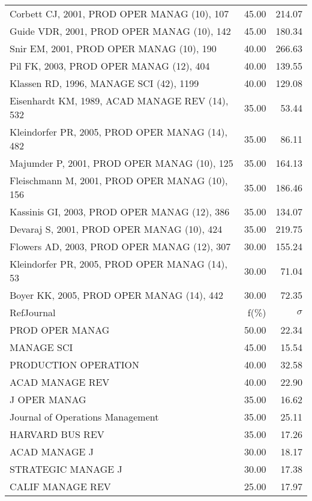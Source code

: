 \documentclass[a4paper,11pt]{report}
\begin{document}
\begin{landscape}
\begin{table}[!ht]
{\begin{tabular}{|l r r|}
Corbett CJ, 2001, PROD OPER MANAG (10), 107 & 45.00 & 214.07\\
Guide VDR, 2001, PROD OPER MANAG (10), 142 & 45.00 & 180.34\\
Snir EM, 2001, PROD OPER MANAG (10), 190 & 40.00 & 266.63\\
Pil FK, 2003, PROD OPER MANAG (12), 404 & 40.00 & 139.55\\
Klassen RD, 1996, MANAGE SCI (42), 1199 & 40.00 & 129.08\\
Eisenhardt KM, 1989, ACAD MANAGE REV (14), 532 & 35.00 & 53.44\\
Kleindorfer PR, 2005, PROD OPER MANAG (14), 482 & 35.00 & 86.11\\
Majumder P, 2001, PROD OPER MANAG (10), 125 & 35.00 & 164.13\\
Fleischmann M, 2001, PROD OPER MANAG (10), 156 & 35.00 & 186.46\\
Kassinis GI, 2003, PROD OPER MANAG (12), 386 & 35.00 & 134.07\\
Devaraj S, 2001, PROD OPER MANAG (10), 424 & 35.00 & 219.75\\
Flowers AD, 2003, PROD OPER MANAG (12), 307 & 30.00 & 155.24\\
Kleindorfer PR, 2005, PROD OPER MANAG (14), 53 & 30.00 & 71.04\\
Boyer KK, 2005, PROD OPER MANAG (14), 442 & 30.00 & 72.35\\
\hline
\hline
RefJournal & f(\%) & $\sigma$\\
\hline
PROD OPER MANAG & 50.00 & 22.34\\
MANAGE SCI & 45.00 & 15.54\\
PRODUCTION OPERATION & 40.00 & 32.58\\
ACAD MANAGE REV & 40.00 & 22.90\\
J OPER MANAG & 35.00 & 16.62\\
Journal of Operations Management & 35.00 & 25.11\\
HARVARD BUS REV & 35.00 & 17.26\\
ACAD MANAGE J & 30.00 & 18.17\\
STRATEGIC MANAGE J & 30.00 & 17.38\\
CALIF MANAGE REV & 25.00 & 17.97\\
\hline
\end{tabular}
}
\end{table}

\end{landscape}
\end{document}
